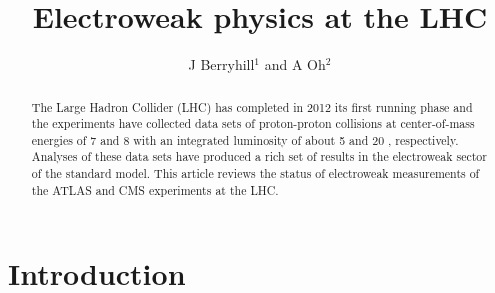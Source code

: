 \documentclass[12pt]{iopart}
\begin{document}
\title[Electroweak physics at the LHC]{Electroweak physics at the LHC}
\author{J Berryhill$^1$ and A Oh$^2$}

\address{$^1$ Fermi National Accelerator Laboratory, Batavia, IL, USA}
\address{$^2$ School of Physics and Astronomy, University of Manchester, Manchester, UK}


\begin{abstract}
The Large Hadron Collider (LHC) has completed in 2012 its first
running phase and the experiments have collected data sets of proton-proton
collisions at center-of-mass energies of 7 and 8 \TeV\xspace with an
integrated luminosity of about 5 and 20 \ifb, respectively.  Analyses
of these data sets have produced a rich set of results in the
electroweak sector of the standard model. This article reviews the
status of electroweak measurements of the ATLAS and CMS experiments at
the LHC.
\end{abstract}

%
%
\submitto{\jpg}
%
\maketitle
%
%


\section{Introduction}

%
\end{document}
